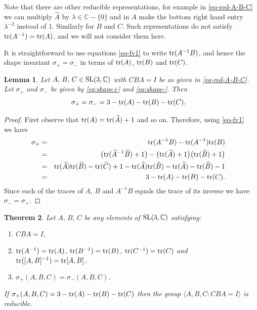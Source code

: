 \documentclass[11pt]{amsart}
\newtheorem{theorem}{Theorem}[section]
\newtheorem{lemma}[theorem]{Lemma}
\numberwithin{equation}{section}
\begin{document}
Note that there are other reducible representations, for example in \eqref{eq-red-A-B-C}
we can multiply $\widehat{A}$ by $\lambda\in{\mathbb C}-\{0\}$ and in $A$ make the bottom right hand 
entry $\lambda^{-2}$ instead of $1$. 
Similarly for $B$ and $C$. Such representations do not satisfy ${\rm tr}(A^{-1})={\rm tr}(A)$, and we will not consider them here. 

It is straightforward to use equations \eqref{eq-fv1} to write ${\rm tr}(A^{-1}B)$, and hence the shape invariant 
$\sigma_+=\sigma_-$ in terms of ${\rm tr}(A)$, ${\rm tr}(B)$ and ${\rm tr}(C)$.

\begin{lemma}\label{lem-shape-red}
Let $A,\,B,\,C\in{\rm SL}(3,{\mathbb C})$ with $CBA=I$ be as given in \eqref{eq-red-A-B-C}. Let
$\sigma_+$ and $\sigma_-$ be given by \eqref{eq:shape+} and  \eqref{eq:shape-}. Then
\begin{equation}\label{eq-red-shape}
\sigma_+=\sigma_-=3-{\rm tr}(A)-{\rm tr}(B)-{\rm tr}(C).
\end{equation}
\end{lemma}

\begin{proof}
First observe that ${\rm tr}(A)={\rm tr}(\widehat{A})+1$ and so on. Therefore, using \eqref{eq-fv1} we have
\begin{eqnarray*}
\sigma_+ & = & {\rm tr}(A^{-1}B)-{\rm tr}(A^{-1}){\rm tr}(B) \\
& = & \bigl({\rm tr}(\widehat{A}^{-1}\widehat{B})+1\bigr)-\bigl({\rm tr}(\widehat{A})+1\bigr)\bigl({\rm tr}(\widehat{B})+1\bigr) \\
& = & {\rm tr}(\widehat{A}){\rm tr}(\widehat{B})-{\rm tr}(\widehat{C})+1
-{\rm tr}(\widehat{A}){\rm tr}(\widehat{B})-{\rm tr}(\widehat{A})-{\rm tr}(\widehat{B})-1 \\
& = & 3-{\rm tr}(A)-{\rm tr}(B)-{\rm tr}(C).
\end{eqnarray*}
Since each of the traces of $A$, $B$ and $A^{-1}B$ equals the trace of its inverse we have $\sigma_-=\sigma_+$.
\end{proof}

\medskip

\begin{theorem}\label{thm-red}
Let $A,\,B,\,C$ be any elements of ${\rm SL}(3,{\mathbb C})$ satisfying:
\begin{enumerate}
\item[(a)] $CBA=I$, 
\item[(b)] ${\rm tr}(A^{-1})={\rm tr}(A)$, ${\rm tr}(B^{-1})={\rm tr}(B)$, ${\rm tr}(C^{-1})={\rm tr}(C)$ and 
${\rm tr}([A,B]^{-1})={\rm tr}[A,B]$,
\item[(c)] $\sigma_+(A,B,C)=\sigma_-(A,B,C)$.
\end{enumerate}
If $\sigma_+(A,B,C)=3-{\rm tr}(A)-{\rm tr}(B)-{\rm tr}(C)$ then the group 
$\langle A,B,C:CBA=I\rangle$ is reducible.
\end{theorem}
\end{document}
